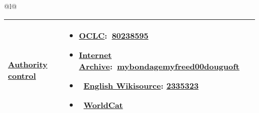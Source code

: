 \begin{longtable}[]{@{}l@{}}
\toprule
\begin{minipage}[t]{0.97\columnwidth}\raggedright\strut
\begin{longtable}[]{@{}ll@{}}
\toprule
\begin{minipage}[t]{0.48\columnwidth}\raggedright\strut
\href{/wiki/Wikisource:Authority_control}{Authority control}\strut
\end{minipage} & \begin{minipage}[t]{0.48\columnwidth}\raggedright\strut
\begin{itemize}
\tightlist
\item
  \href{https://en.wikipedia.org/wiki/OCLC}{OCLC}:~{\href{http://www.worldcat.org/oclc/80238595?lang=en}{80238595}}
\item
  \href{https://en.wikipedia.org/wiki/Internet_Archive}{Internet
  Archive}:~{\href{http://www.archive.org/details/mybondagemyfreed00douguoft}{mybondagemyfreed00douguoft}}
\item
  ~{\href{/wiki/Wikisource:Authority_control}{English Wikisource}:
  \href{//en.wikisource.org/w/index.php?curid=2335323}{2335323}}
\item
  ~{\href{http://www.worldcat.org/oclc/80238595}{WorldCat}}
\end{itemize}\strut
\end{minipage}\tabularnewline
\bottomrule
\end{longtable}\strut
\end{minipage}\tabularnewline
\bottomrule
\end{longtable}
